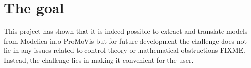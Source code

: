 \section{The goal}
This project has shown that it is indeed possible to extract and translate models from Modelica into ProMoVis but for future development the challenge does not lie in any issues related to control theory or mathematical obstructions FIXME. Instead, the challenge lies in making it convenient for the user. 
